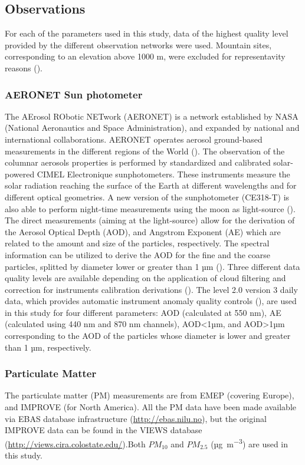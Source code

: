 \documentclass[journal abbreviation, manuscript]{copernicus}
\begin{document}
\subsection{Observations}

For each of the parameters used in this study, data of the highest quality level provided by the different observation networks were used. Mountain sites, corresponding to an elevation above 1000 m, were excluded for representavity reasons (\cite{kinne2013mac}).

\subsubsection{AERONET Sun photometer}

The AErosol RObotic NETwork (AERONET) is a network established by NASA (National Aeronautics and Space Administration), and expanded by national and international collaborations. AERONET operates aerosol ground-based measurements in the different regions of the World (\cite{holben2001emerging}). The observation of the columnar aerosols properties is performed by standardized and calibrated solar-powered CIMEL Electronique sunphotometers. These instruments measure the solar radiation reaching the surface of the Earth at different wavelengths and for different optical geometries. A new version of the sunphotometer (CE318-T) is also able to perform night-time measurements using the moon as light-source (\cite{barreto2016new}). The direct measurements (aiming at the light-source) allow for the derivation of the Aerosol Optical Depth (AOD), and Angstrom Exponent (AE) which are related to the amount and size of the particles, respectively. The spectral information can be utilized to derive the AOD for the fine and the coarse particles, splitted by diameter lower or greater than 1 µm (\cite{o2003spectral}). Three different data quality levels are available depending on the application of cloud filtering and correction for instruments calibration derivations (\cite{smirnov2000cloud,smirnov2004aeronet}). The level 2.0 version 3 daily data, which provides automatic instrument anomaly quality controls (\cite{giles2019advancements}), are used in this study for four different parameters:
AOD (calculated at 550 nm), AE (calculated using 440 nm and 870 nm channels), AOD<1µm, and AOD>1µm corresponding to the AOD of the particles whose diameter is lower and greater than 1 µm, respectively.

\subsubsection{Particulate Matter}
The particulate matter (PM) measurements are from EMEP (covering Europe), and IMPROVE (for North America). All the PM data have been made available via EBAS database infrastructure  (\url{http://ebas.nilu.no}), but the original IMPROVE data can be found in the VIEWS database (\url{http://views.cira.colostate.edu/}).Both $PM_{10}$ and $PM_{2.5}$ (\unit{µg.m^{-3}}) are used in this study.
\end{document}
